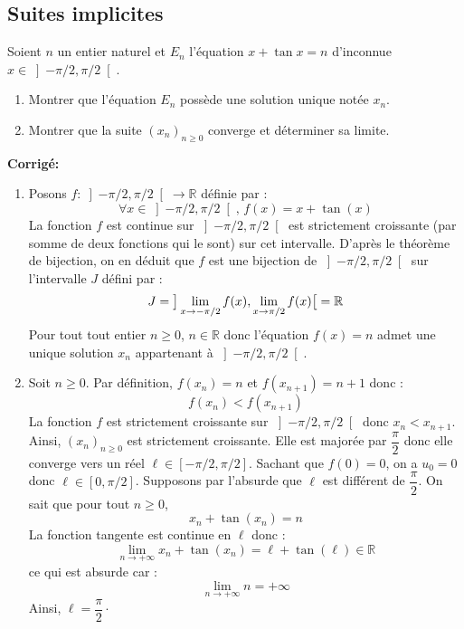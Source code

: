 \documentclass[a4paper,twoside,french,10pt]{VcCours}
\newcommand{\corr}{\textbf{Corrigé:}}
\begin{document}
\medskip

\subsection{Suites implicites}

\medskip

\begin{Exercice}{} Soient $n$ un entier naturel et $E_n $ l'équation $x + \tan x = n$ d'inconnue $x \in \left] { - \pi  / 2,\pi  / 2} \right[$.

\begin{enumerate}
\item Montrer que l'équation $E_n$ possède une solution unique notée $x_n$.
\item Montrer que la suite $(x_n)_{n \geq 0}$ converge et déterminer sa limite.
\end{enumerate}
\end{Exercice} 



\corr



\begin{enumerate}
\item Posons $f : \left] { - \pi  / 2,\pi  / 2} \right[ \rightarrow \mathbb{R}$ définie par :
$$ \forall x \in \left] { - \pi  / 2,\pi  / 2} \right[, \, f(x) = x+ \tan(x)$$
La fonction $f$ est continue sur $\left] { - \pi  / 2,\pi  / 2} \right[$ est strictement croissante (par somme de deux fonctions qui le sont) sur cet intervalle. D'après le théorème de bijection, on en déduit que $f$ est une bijection de $\left] { - \pi  / 2,\pi  / 2} \right[$ sur l'intervalle $J$ défini par :
$$ J = \big{]} \lim_{x \rightarrow - \pi/2} f(x), \lim_{x \rightarrow \pi/2} f(x) \big{[} = \mathbb{R}$$
Pour tout tout entier $n \geq 0$, $n \in \mathbb{R}$ donc l'équation $f(x)=n$ admet une unique solution $x_n$ appartenant à $\left] { - \pi  / 2,\pi  / 2} \right[$.
\item Soit $n \geq 0$. Par définition, $f(x_n) =n$ et $f(x_{n+1})=n+1$ donc :
$$ f(x_n) < f(x_{n+1})$$
La fonction $f$ est strictement croissante sur $\left] { - \pi  / 2,\pi  / 2} \right[$ donc $x_n < x_{n+1}$. Ainsi, $(x_n)_{n \geq 0}$ est strictement croissante. Elle est majorée par $\dfrac{\pi}{2}$ donc elle converge vers un réel $\ell \in \left[ { - \pi  / 2,\pi  / 2} \right]$. Sachant que $f(0)=0$, on a $u_0=0$ donc $\ell \in \left[ {0,\pi  / 2} \right]$. Supposons par l'absurde que $\ell$ est différent de $\dfrac{\pi}{2}$. On sait que pour tout $n \geq 0$,
$$ x_n + \tan(x_n) = n$$
La fonction tangente est continue en $\ell$ donc :
$$ \lim_{n \rightarrow + \infty} x_n + \tan(x_n) = \ell + \tan(\ell) \in \mathbb{R}$$
ce qui est absurde car :
$$ \lim_{n \rightarrow + \infty} n = + \infty$$
Ainsi, $\ell = \dfrac{\pi}{2}\cdot$
\end{enumerate}
\end{document}
